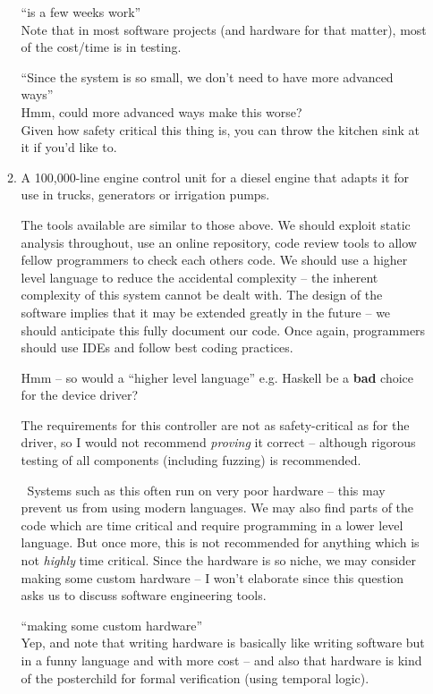 \documentclass[10pt,\jkfside,a4paper]{article}
\begin{document}
\begin{enumerate}
\begin{enumerate}[label=(\alph*)]
{\color{blue}
``is a few weeks work''\\
Note that in most software projects (and hardware for that matter), most of the cost/time is in testing.
}

{\color{blue}
``Since the system is so small, we don't need to have more advanced ways''\\
Hmm, could more advanced ways make this worse?\\
Given how safety critical this thing is, you can throw the kitchen sink at it if you'd like to.
}

\item A 100,000-line engine control unit for a diesel engine that adapts it for use in trucks,
generators or irrigation pumps.

The tools available are similar to those above. We should exploit static analysis throughout,
use an online repository, code review tools to allow fellow programmers to check
each others code. We should use a higher level language to reduce the
accidental complexity \dag -- the inherent complexity of this system cannot be dealt with.
The design of the software implies that it may be extended greatly in the future --
we should anticipate this fully document our code.
Once again, programmers should use IDEs and follow best coding practices.

{\color{blue}
Hmm -- so would a ``higher level language'' e.g. Haskell be a \textbf{bad} choice for the device driver?
}

The requirements for this controller are not as safety-critical as for the driver, so I would
not recommend \textit{proving} it correct -- although rigorous testing of all components
(including fuzzing) is recommended.

\dag \ Systems such as this often run on very poor hardware -- this may prevent us from using
modern languages. We may also find parts of the code which are time critical and require
programming in a lower level language. But once more, this is not recommended for anything
which is not \textit{highly} time critical. Since the hardware is so niche, we may consider
making some custom hardware -- I won't elaborate since this question asks us to discuss
software engineering tools.

{\color{blue}
``making some custom hardware''\\
Yep, and note that writing hardware is basically like writing software but in a funny
language and with more cost -- and also that hardware is kind of the posterchild for
formal verification (using temporal logic).
}


\end{enumerate}
\end{enumerate}
\end{document}
